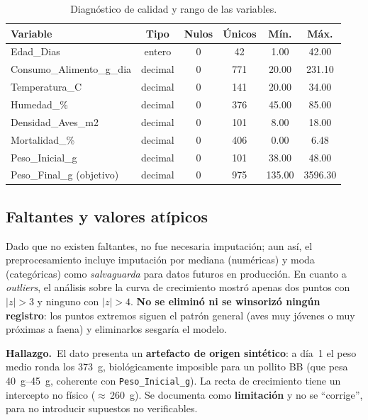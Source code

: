 \documentclass[11pt,a4paper]{article}
\newcommand{\hallazgo}[1]{%
  \par\medskip\noindent\colorbox{grisclaro}{%
  \begin{minipage}{0.985\linewidth}\small\vspace{2pt}\textbf{\textcolor{azulcorp}{Hallazgo.}}\ #1\vspace{2pt}\end{minipage}}\par\medskip}
\begin{document}
\begin{table}[H]
\centering
\caption{Diagnóstico de calidad y rango de las variables.}
\label{tab:calidad}
\small
\begin{tabular}{l c c c S[table-format=4.2] S[table-format=4.2]}
\toprule
\textbf{Variable} & \textbf{Tipo} & \textbf{Nulos} & \textbf{Únicos} & {\textbf{Mín.}} & {\textbf{Máx.}}\\
\midrule
Edad\_Dias              & entero  & 0 & 42  & 1.00   & 42.00\\
Consumo\_Alimento\_g\_dia & decimal & 0 & 771 & 20.00  & 231.10\\
Temperatura\_C          & decimal & 0 & 141 & 20.00  & 34.00\\
Humedad\_\%             & decimal & 0 & 376 & 45.00  & 85.00\\
Densidad\_Aves\_m2      & decimal & 0 & 101 & 8.00   & 18.00\\
Mortalidad\_\%          & decimal & 0 & 406 & 0.00   & 6.48\\
Peso\_Inicial\_g        & decimal & 0 & 101 & 38.00  & 48.00\\
Peso\_Final\_g (objetivo) & decimal & 0 & 975 & 135.00 & 3596.30\\
\bottomrule
\end{tabular}
\end{table}

\subsection{Faltantes y valores atípicos}
Dado que no existen faltantes, no fue necesaria imputación; aun así, el preprocesamiento incluye
imputación por mediana (numéricas) y moda (categóricas) como \emph{salvaguarda} para datos futuros en
producción. En cuanto a \emph{outliers}, el análisis sobre la curva de crecimiento mostró apenas dos
puntos con $|z| > 3$ y ninguno con $|z| > 4$. \textbf{No se eliminó ni se winsorizó ningún registro}:
los puntos extremos siguen el patrón general (aves muy jóvenes o muy próximas a faena) y eliminarlos
sesgaría el modelo.

\hallazgo{El dato presenta un \textbf{artefacto de origen sintético}: a día~1 el peso medio ronda los
\SI{373}{\gram}, biológicamente imposible para un pollito BB (que pesa \SIrange{40}{45}{\gram}, coherente
con \texttt{Peso\_Inicial\_g}). La recta de crecimiento tiene un intercepto no físico ($\approx$\,\SI{260}{\gram}).
Se documenta como \textbf{limitación} y no se ``corrige'', para no introducir supuestos no verificables.}
\end{document}

